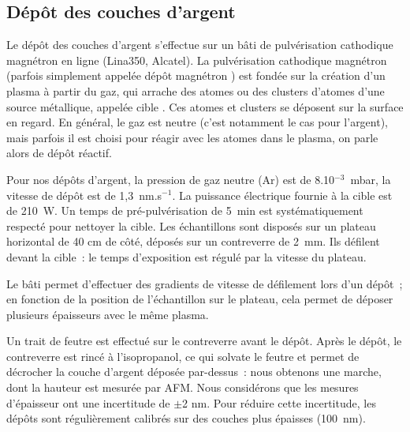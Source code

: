 	\subsection{Dépôt des couches d'argent}
Le dépôt des couches d'argent s'effectue sur un bâti de pulvérisation cathodique magnétron en ligne (Lina350, Alcatel). La pulvérisation cathodique magnétron (parfois simplement appelée \og dépôt magnétron \fg) est fondée sur la création d'un plasma à partir du gaz, qui arrache des atomes ou des clusters d'atomes d'une source métallique, appelée \og cible \fg{}. Ces atomes et clusters se déposent sur la surface en regard. En général, le gaz est neutre (c'est notamment le cas pour l'argent), mais parfois il est choisi pour réagir avec les atomes dans le plasma, on parle alors de dépôt réactif. \par 
Pour nos dépôts d'argent, la pression de gaz neutre (Ar) est de 8.10$^{-3}$~mbar, la vitesse de dépôt est de 1,3~nm.s$^{-1}$. La puissance électrique fournie à la cible est de 210~W. Un temps de pré-pulvérisation de 5~min est systématiquement respecté pour nettoyer la cible. Les échantillons sont disposés sur un plateau horizontal de 40 cm de côté, déposés sur un contreverre de 2~mm. Ils défilent devant la cible~: le temps d'exposition est régulé par la vitesse du plateau.\par 
Le bâti permet d'effectuer des gradients de vitesse de défilement lors d'un dépôt~; en fonction de la position de l'échantillon sur le plateau, cela permet de déposer plusieurs épaisseurs avec le même plasma.\par 
Un trait de feutre est effectué sur le contreverre avant le dépôt. Après le dépôt, le contreverre est rincé à l'isopropanol, ce qui solvate le feutre et permet de décrocher la couche d'argent déposée par-dessus~: nous obtenons une marche, dont la hauteur est mesurée par AFM. Nous considérons que les mesures d'épaisseur ont une incertitude de $\pm$2 nm. Pour réduire cette incertitude, les dépôts sont régulièrement calibrés sur des couches plus épaisses (100~nm).\par 


